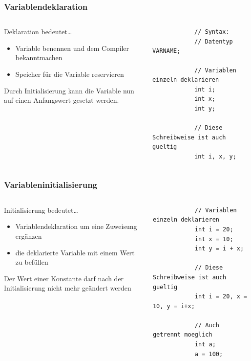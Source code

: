 \begin{frame}[fragile]
	\frametitle{Variablendeklaration}
	\begin{columns}
		\begin{column}{0.5\textwidth}
		\small
			Deklaration bedeutet\ldots
			\begin{itemize}
			  \item Variable benennen und dem Compiler bekanntmachen
			  \item Speicher für die Variable reservieren
			\end{itemize}
			Durch Initialisierung kann die Variable nun auf einen Anfangswert
			gesetzt werden.
		\end{column}
		\begin{column}{0.5\textwidth}
			\begin{lstlisting}
			// Syntax:
			// Datentyp VARNAME;
			
			// Variablen einzeln deklarieren
			int i;
			int x;
			int y;
			
			// Diese Schreibweise ist auch gueltig
			int i, x, y;
			\end{lstlisting}
		\end{column}
	\end{columns}
\end{frame}

\begin{frame}[fragile]
	\frametitle{Variableninitialisierung}
	\begin{columns}
		\begin{column}{0.5\textwidth}
			\small
			Initialisierung bedeutet\ldots
			\begin{itemize}
			  \item Variablendeklaration um eine Zuweisung ergänzen
			  \item die deklarierte Variable mit einem Wert zu befüllen
			\end{itemize}
			Der Wert einer Konstante darf nach der Initialisierung nicht mehr
			geändert werden
		\end{column}
		\begin{column}{0.5\textwidth}
			\begin{lstlisting}
			// Variablen einzeln deklarieren
			int i = 20;
			int x = 10;
			int y = i + x;
			
			// Diese Schreibweise ist auch gueltig
			int i = 20, x = 10, y = i+x;
			
			// Auch getrennt moeglich
			int a;
			a = 100;
			\end{lstlisting}
		\end{column}
	\end{columns}
\end{frame}

